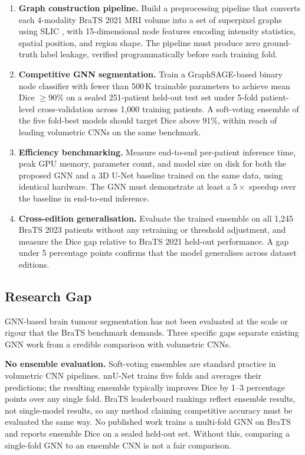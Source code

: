 \documentclass{article}
\begin{document}
\begin{enumerate}
    \item \textbf{Graph construction pipeline.} Build a preprocessing
    pipeline that converts each 4-modality BraTS 2021 MRI volume into a
    set of superpixel graphs using SLIC \cite{achanta2012slic}, with
    15-dimensional node features encoding intensity statistics, spatial
    position, and region shape. The pipeline must produce zero
    ground-truth label leakage, verified programmatically before each
    training fold.

    \item \textbf{Competitive GNN segmentation.} Train a GraphSAGE-based
    \cite{hamilton2017graphsage} binary node classifier with fewer than
    500\,K trainable parameters to achieve mean Dice $\geq 90\%$ on a
    sealed 251-patient held-out test set under 5-fold patient-level
    cross-validation across 1,000 training patients. A soft-voting
    ensemble of the five fold-best models should target Dice above 91\%,
    within reach of leading volumetric CNNs on the same benchmark.

    \item \textbf{Efficiency benchmarking.} Measure end-to-end
    per-patient inference time, peak GPU memory, parameter count, and
    model size on disk for both the proposed GNN and a 3D U-Net baseline
    \cite{cicek20163d} trained on the same data, using identical
    hardware. The GNN must demonstrate at least a $5\times$ speedup over
    the baseline in end-to-end inference.

    \item \textbf{Cross-edition generalisation.} Evaluate the trained
    ensemble on all 1,245 BraTS 2023 patients without any retraining or
    threshold adjustment, and measure the Dice gap relative to BraTS 2021
    held-out performance. A gap under 5 percentage points confirms that
    the model generalises across dataset editions.
\end{enumerate}

\subsection{Research Gap}
\label{sec:gap}

GNN-based brain tumour segmentation has not been evaluated at the scale
or rigour that the BraTS benchmark demands. Three specific gaps separate
existing GNN work from a credible comparison with volumetric CNNs.

\textbf{No ensemble evaluation.} Soft-voting ensembles are standard
practice in volumetric CNN pipelines. nnU-Net \cite{isensee2021nnunet}
trains five folds and averages their predictions; the resulting ensemble
typically improves Dice by 1--3 percentage points over any single fold.
BraTS leaderboard rankings reflect ensemble results, not single-model
results, so any method claiming competitive accuracy must be evaluated
the same way. No published work trains a multi-fold GNN on BraTS and
reports ensemble Dice on a sealed held-out set. Without this, comparing
a single-fold GNN to an ensemble CNN is not a fair comparison.
\end{document}
